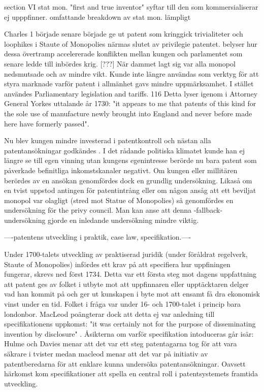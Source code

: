 section VI stat mon. "first and true inventor" syftar till den som kommersialiserar ej upppfinner.
omfattande breakdown av stat mon. lämpligt

Charles 1 började senare började ge ut patent som kringgick trivialiteter och loophikes i Staute of
Monopolies närmas slutet av privilegie patentet. \cite{Fox} belyser hur dessa övertramp accelererade
konflikten mellan kungen och parlamentet som senare ledde till inbördes krig. [???] När dammet lagt sig
var alla monopol nedsmutsade och av mindre vikt. Kunde inte längre användas som verktyg för att styra
marknade varför patent i allmänhet gavs mindre uppmärksamhet. I stället användes Parliamentary
legislation and tariffs. 116 Detta lyser igenom i Attorney General Yorkes uttalande år 1730: "it appears to me that patents of this kind for the sole use of manufacture newly brought into England and never before made here have formerly passed"\cite{macleod2}. 

Nu blev kungen mindre investerad i patentkontroll och nästan alla
patentansökningar godkändes \cite{ochra}. I det rådande politiska klimatet kunde han ej längre se till
egen vinning utan kungens egenintresse berörde nu bara patent som påverkade befinitliga inkomstskanaler
negativt. \cite{macleod2} Om kungen eller millitären berördes av en ansökan genomfördes dock en grundlig
undersökning. Likaså om en tvist uppstod antingen för patentintrång eller om någon ansåg att ett beviljat
monopol var olagligt (stred mot Statue of Monopolies) så genomfördes en undersökning för the privy
council. Man kan anse att denna -fallback- undersökning gjorde en inledande undersökning mindre viktig.

----patentens utveckling i praktik, case law, specifikation.----

Under 1700-talets utveckling av praktiserad juridik (under föråldrat regelverk, Staute of Monopolies) infördes ett krav på att specifiera hur uppfiningen fungerar, skrevs ned först 1734. Detta
var ett första steg mot dagens uppfattning att patent ges av folket i utbyte mot att uppfinnaren eller
upptäcktaren delger vad han kommit på och ger ut kunskapen i byte mot att ensamt få dra ekonomisk vinst
under en tid. Folket i fråga var under 16- och 1700-talet i princip bara londonbor. MacLeod poängterar dock att detta ej var anledning till specifikationens uppkomst: "it was certainly not for the purpose of disseminating invention by disclosure" \cite{macleod2}. Åsikterna om varför specifikation intoduceras går isär: Hulme och Davies menar att det var ett steg patentagarna tog för att vara säkrare i tvister medan macleod menar att det var på initiativ av patentberedarna för att enklare kunna undersöka patentansökningar. Oavsett härkomst kom specifikationer att spella en central roll i patentsystemets framtida utveckling.

